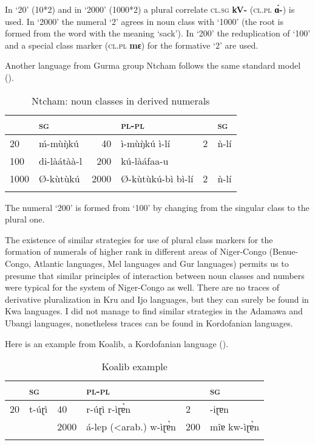 In ‘20’ (10*2) and in ‘2000’ (1000*2) a plural correlate \textsc{cl}.\textsc{sg} \textbf{kV-} (\textsc{cl}.\textsc{pl} \textbf{{\'{ɑ}}-}) is used. In ‘2000’ the numeral ‘2’ agrees in noun class with ‘1000’ (the root is formed from the word with the meaning ‘sack’). In ‘200’ the reduplication of ‘100’ and a special class marker (\textsc{cl}.\textsc{pl} \textbf{mɛ}) for the formative ‘2’ are used. 

Another language from Gurma group Ntcham follows the same standard model ().


\begin{table}
\caption{\label{tab:1:18} Ntcham: noun classes in derived numerals}

\begin{tabularx}{.8\textwidth}{XX rlrl}
\lsptoprule

& \textsc{sg} & & \textsc{pl}-\textsc{pl} & & \textsc{sg}\\
\midrule
20 &  {\'{m}}-m{\`{u}}{\`{ŋ}}kú & 40 &  ì-m{\`{u}}{\`{ŋ}}kú ì-lí & 2 &  {\`{n}}-lí \\
100 &  di-làátàà-l & 200 &  kú-làáfaa-u~ & \\
1000 &  Ø-k{\`{u}}t{\`{u}}kú & 2000 &  Ø-k{\`{u}}t{\`{u}}kú-bì  bì-lí & 2 &  {\`{n}}-lí \\
\lspbottomrule
\end{tabularx}
\end{table}


The numeral `200' is formed from `100' by changing from the singular class to the plural one. 

The existence of similar strategies for use of plural class markers for the formation of numerals of higher rank in different areas of Niger-Congo (Benue-Congo, Atlantic languages, Mel languages and Gur languages) permits us to presume that similar principles of interaction between noun classes and numbers were typical for the system of Niger-Congo as well. There are no traces of derivative pluralization in Kru and Ijo languages, but they can surely be found in Kwa languages. I did not manage to find similar strategies in the Adamawa and Ubangi languages, nonetheless traces can be found in Kordofanian languages. 

Here is an example from Koalib, a Kordofanian language ().

\begin{table}
\caption{Koalib example}
\label{tab:1:19}

\begin{tabularx}{.8\textwidth}{lllXll}
\lsptoprule

&\textsc{sg} && \textsc{pl}-\textsc{pl} && \textsc{sg}\\
\midrule
20  &  t-úɽì & 40  &  r-úɽì r-ìɽ{\`{ɐ}}n            & 2  &  -iɽɐn\\
    &              & 2000  &  á-lep (<arab.) w-ìɽ{\`{ɐ}}n & 200  &  mîɐ kw-ìɽ{\`{ɐ}}n\\
\lspbottomrule
\end{tabularx}
\end{table}
 


